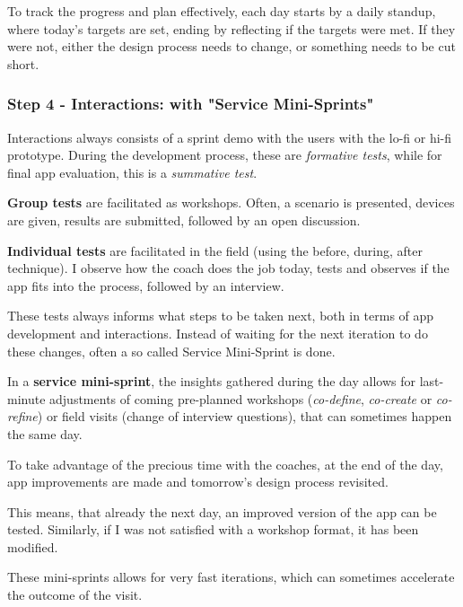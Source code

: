   To track the progress and plan effectively, each day starts by a daily standup, where today's targets are set, ending by reflecting if the targets were met. If they were not, either the design process needs to change, or something needs to be cut short.

  \subsubsection{Step 4 - Interactions: with "Service Mini-Sprints"}
  Interactions always consists of a sprint demo with the users with the lo-fi or hi-fi prototype. During the development process, these are \textit{formative tests}, while for final app evaluation, this is a \textit{summative test}.

    \textbf{Group tests} are facilitated as workshops. Often, a scenario is presented, devices are given, results are submitted, followed by an open discussion.

    \textbf{Individual tests} are facilitated in the field (using the before, during, after technique). I observe how the coach does the job today, tests and observes if the app fits into the process, followed by an interview.

    These tests always informs what steps to be taken next, both in terms of app development and interactions. Instead of waiting for the next iteration to do these changes, often a so called Service Mini-Sprint is done.

    In a \textbf{service mini-sprint}\label{mini-sprint}, the insights gathered during the day allows for last-minute adjustments of coming pre-planned workshops (\textit{co-define}, \textit{co-create} or \textit{co-refine}) or field visits (change of interview questions), that can sometimes happen the same day.

    To take advantage of the precious time with the coaches, at the end of the day, app improvements are made and tomorrow's design process revisited.

    This means, that already the next day, an improved version of the app can be tested. Similarly, if I was not satisfied with a workshop format, it has been modified.

    These mini-sprints allows for very fast iterations, which can sometimes accelerate the outcome of the visit.

